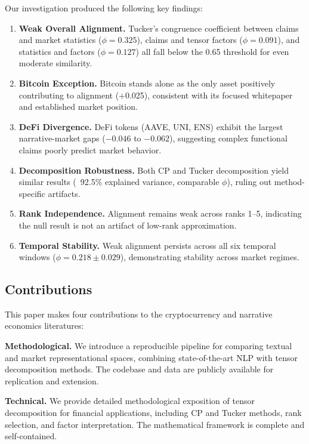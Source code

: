 \documentclass[11pt,twocolumn]{article}
\begin{document}
Our investigation produced the following key findings:

\begin{enumerate}
    \item \textbf{Weak Overall Alignment.} Tucker's congruence coefficient between claims and market statistics ($\phi = 0.325$), claims and tensor factors ($\phi = 0.091$), and statistics and factors ($\phi = 0.127$) all fall below the 0.65 threshold for even moderate similarity.

    \item \textbf{Bitcoin Exception.} Bitcoin stands alone as the only asset positively contributing to alignment (+0.025), consistent with its focused whitepaper and established market position.

    \item \textbf{DeFi Divergence.} DeFi tokens (AAVE, UNI, ENS) exhibit the largest narrative-market gaps ($-0.046$ to $-0.062$), suggesting complex functional claims poorly predict market behavior.

    \item \textbf{Decomposition Robustness.} Both CP and Tucker decomposition yield similar results (~92.5\% explained variance, comparable $\phi$), ruling out method-specific artifacts.

    \item \textbf{Rank Independence.} Alignment remains weak across ranks 1--5, indicating the null result is not an artifact of low-rank approximation.

    \item \textbf{Temporal Stability.} Weak alignment persists across all six temporal windows ($\phi = 0.218 \pm 0.029$), demonstrating stability across market regimes.
\end{enumerate}

\subsection{Contributions}

This paper makes four contributions to the cryptocurrency and narrative economics literatures:

\textbf{Methodological.} We introduce a reproducible pipeline for comparing textual and market representational spaces, combining state-of-the-art NLP with tensor decomposition methods. The codebase and data are publicly available for replication and extension.

\textbf{Technical.} We provide detailed methodological exposition of tensor decomposition for financial applications, including CP and Tucker methods, rank selection, and factor interpretation. The mathematical framework is complete and self-contained.
\end{document}
